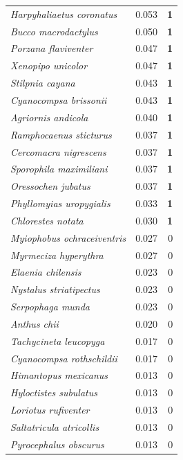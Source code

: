 \documentclass[12pt,a4paper]{article}
\begin{document}
\begin{longtable}{p{6.2cm}cr}
  \rowcolor{grisCelda}\textit{Harpyhaliaetus coronatus} & 0.053 & \textbf{1} \\
  \rowcolor{grisCelda}\textit{Bucco macrodactylus} & 0.050 & \textbf{1} \\
  \rowcolor{grisCelda}\textit{Porzana flaviventer} & 0.047 & \textbf{1} \\
  \rowcolor{grisCelda}\textit{Xenopipo unicolor} & 0.047 & \textbf{1} \\
  \rowcolor{grisCelda}\textit{Stilpnia cayana} & 0.043 & \textbf{1} \\
  \rowcolor{grisCelda}\textit{Cyanocompsa brissonii} & 0.043 & \textbf{1} \\
  \rowcolor{grisCelda}\textit{Agriornis andicola} & 0.040 & \textbf{1} \\
  \rowcolor{grisCelda}\textit{Ramphocaenus sticturus} & 0.037 & \textbf{1} \\
  \rowcolor{grisCelda}\textit{Cercomacra nigrescens} & 0.037 & \textbf{1} \\
  \rowcolor{grisCelda}\textit{Sporophila maximiliani} & 0.037 & \textbf{1} \\
  \rowcolor{grisCelda}\textit{Oressochen jubatus} & 0.037 & \textbf{1} \\
  \rowcolor{grisCelda}\textit{Phyllomyias uropygialis} & 0.033 & \textbf{1} \\
  \rowcolor{grisCelda}\textit{Chlorestes notata} & 0.030 & \textbf{1} \\
  \textit{Myiophobus ochraceiventris} & 0.027 & 0 \\
  \textit{Myrmeciza hyperythra} & 0.027 & 0 \\
  \textit{Elaenia chilensis} & 0.023 & 0 \\
  \textit{Nystalus striatipectus} & 0.023 & 0 \\
  \textit{Serpophaga munda} & 0.023 & 0 \\
  \textit{Anthus chii} & 0.020 & 0 \\
  \textit{Tachycineta leucopyga} & 0.017 & 0 \\
  \textit{Cyanocompsa rothschildii} & 0.017 & 0 \\
  \textit{Himantopus mexicanus} & 0.013 & 0 \\
  \textit{Hyloctistes subulatus} & 0.013 & 0 \\
  \textit{Loriotus rufiventer} & 0.013 & 0 \\
  \textit{Saltatricula atricollis} & 0.013 & 0 \\
  \textit{Pyrocephalus obscurus} & 0.013 & 0 \\

\end{longtable}
\end{document}
